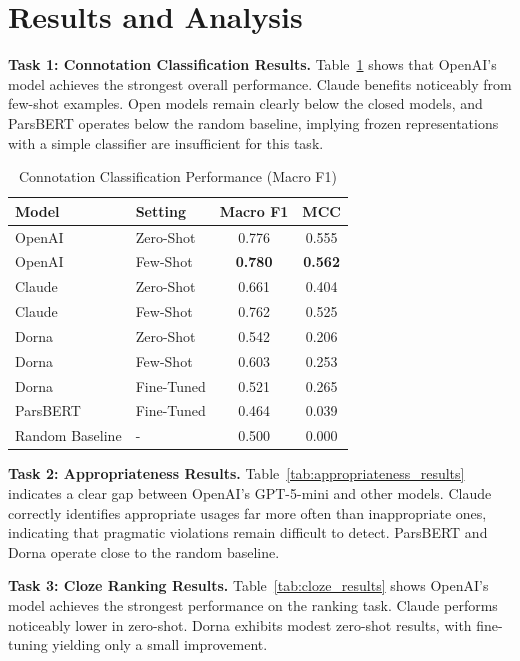 \documentclass[11pt,a4paper]{article}
\begin{document}
\section{Results and Analysis}

\textbf{Task 1: Connotation Classification Results.}
Table~\ref{tab:connotation_results} shows that OpenAI’s model achieves the strongest overall performance. Claude benefits noticeably from few-shot examples. Open models remain clearly below the closed models, and ParsBERT operates below the random baseline, implying frozen representations with a simple classifier are insufficient for this task.

\begin{table}[t]
\centering
\small
\caption{Connotation Classification Performance (Macro F1)}
\label{tab:connotation_results}
\begin{tabular}{llcc}
\toprule
\textbf{Model} & \textbf{Setting} & \textbf{Macro F1} & \textbf{MCC} \\
\midrule
OpenAI & Zero-Shot & 0.776 & 0.555 \\
OpenAI & Few-Shot & \textbf{0.780} & \textbf{0.562} \\
Claude & Zero-Shot & 0.661 & 0.404 \\
Claude & Few-Shot & 0.762 & 0.525 \\
Dorna & Zero-Shot & 0.542 & 0.206 \\
Dorna & Few-Shot & 0.603 & 0.253 \\
Dorna & Fine-Tuned & 0.521 & 0.265 \\
ParsBERT & Fine-Tuned & 0.464 & 0.039 \\
\midrule
Random Baseline & - & 0.500 & 0.000 \\
\bottomrule
\end{tabular}
\end{table}

\textbf{Task 2: Appropriateness Results.}
Table~\ref{tab:appropriateness_results} indicates a clear gap between OpenAI’s GPT-5-mini and other models. Claude correctly identifies appropriate usages far more often than inappropriate ones, indicating that pragmatic violations remain difficult to detect. ParsBERT and Dorna operate close to the random baseline.

\textbf{Task 3: Cloze Ranking Results.}
Table~\ref{tab:cloze_results} shows OpenAI’s model achieves the strongest performance on the ranking task. Claude performs noticeably lower in zero-shot. Dorna exhibits modest zero-shot results, with fine-tuning yielding only a small improvement.
\end{document}
